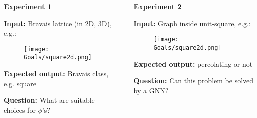\vspace{-0.5cm}
\begin{columns}[T]
    \begin{column}{0.49\textwidth}
        \textbf{Experiment 1}\par
        \textbf{Input:} Bravais lattice (in 2D, 3D), e.g.:
        \begin{figure}
            \centering
            \texttt{[image: Goals/square2d.png]}                        
        \end{figure}
        \textbf{Expected output:} Bravais class, e.g. square\par
        \textbf{Question:} What are suitable choices for $\phi$'s?
    \end{column}
    \begin{column}{0.01\textwidth}
    \end{column}
    \begin{column}{0.49\textwidth}
        \textbf{Experiment 2}\par  
        \textbf{Input:} Graph inside unit-square, e.g.: 
        \begin{figure}
            \centering
            \texttt{[image: Goals/square2d.png]}                        
        \end{figure}
        \textbf{Expected output:} percolating or not\par
        \textbf{Question:} Can this problem be solved by a GNN?
    \end{column}
\end{columns}